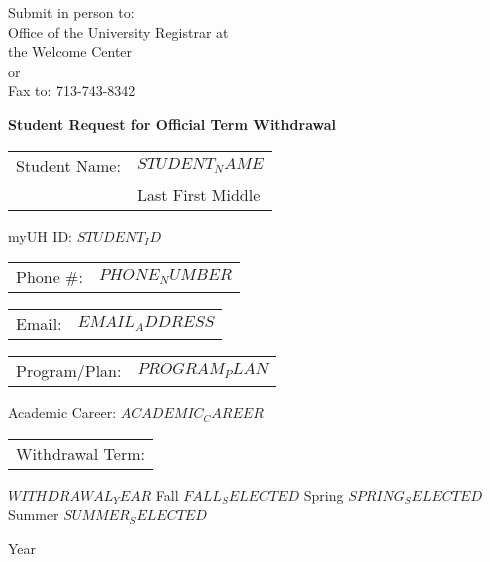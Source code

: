 \documentclass[11pt]{article}
\newcommand{\studentName}{$STUDENT_NAME$}
\newcommand{\studentID}{$STUDENT_ID$}
\newcommand{\phoneNumber}{$PHONE_NUMBER$}
\newcommand{\emailAddress}{$EMAIL_ADDRESS$}
\newcommand{\programPlan}{$PROGRAM_PLAN$}
\newcommand{\academicCareer}{$ACADEMIC_CAREER$}
\newcommand{\withdrawalYear}{$WITHDRAWAL_YEAR$}
\newcommand{\seasonFall}{$FALL_SELECTED$}
\newcommand{\seasonSpring}{$SPRING_SELECTED$}
\newcommand{\seasonSummer}{$SUMMER_SELECTED$}
\begin{document}
\thispagestyle{empty}

\begin{minipage}{0.5\textwidth}
  \raggedleft
  Submit in person to:\\
  Office of the University Registrar at\\
  the Welcome Center\\
  or\\
  Fax to: 713-743-8342
\end{minipage}

\begin{center}
  \textbf{\Large Student Request for Official Term Withdrawal}
\end{center}

\noindent\begin{tabular}{@{}p{1.8in}p{4.5in}@{}}
Student Name: & \underline{\studentName} \\
 & \scriptsize{Last \hspace{1.5in} First \hspace{1.5in} Middle} \\
\end{tabular}
\hfill myUH ID: \underline{\studentID}

\noindent\begin{tabular}{@{}p{1.8in}p{4.5in}@{}}
Phone \#: & \underline{\phoneNumber} \\
\end{tabular}
\noindent\begin{tabular}{@{}p{1.8in}p{4.5in}@{}}
Email: & \underline{\emailAddress} \\
\end{tabular}

\noindent\begin{tabular}{@{}p{1.8in}p{4.5in}@{}}
Program/Plan: & \underline{\programPlan} \\
\end{tabular}
\hfill Academic Career: \underline{\academicCareer}

\noindent\begin{tabular}{@{}p{1.8in}@{}}
Withdrawal Term: \\
\end{tabular}
\underline{\withdrawalYear} \hspace{0.2in} Fall \seasonFall \hspace{0.2in} Spring \seasonSpring \hspace{0.2in} Summer \seasonSummer
\begin{flushright}
\scriptsize{Year}
\end{flushright}
\end{document}
